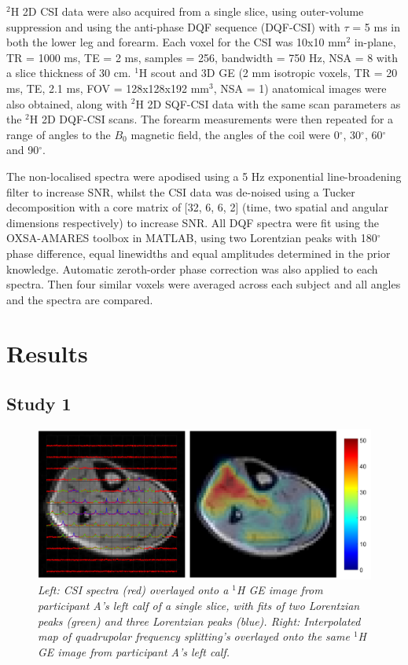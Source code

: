 $^2$H 2D \ac{CSI} data were also acquired from a single slice, using outer-volume suppression and using the anti-phase \ac{DQF} sequence (\ac{DQF}-\ac{CSI}) with $\tau$ = 5 ms in both the lower leg and forearm. Each voxel for the \ac{CSI} was 10x10 mm$^2$ in-plane, \ac{TR} = 1000 ms, \ac{TE} = 2 ms, samples = 256, bandwidth = 750 Hz, NSA = 8 with a slice thickness of 30 cm. $^1$H scout and 3D \ac{GE} (2 mm isotropic voxels, \ac{TR} = 20 ms, \ac{TE}, 2.1 ms, \ac{FOV} = 128x128x192 mm$^3$, NSA = 1) anatomical images were also obtained, along with $^2$H 2D \ac{SQF}-\ac{CSI} data with the same scan parameters as the $^2$H 2D \ac{DQF}-\ac{CSI} scans. The forearm measurements were then repeated for a range of angles to the $B_0$ magnetic field, the angles of the coil were 0$^\circ$, 30$^\circ$, 60$^\circ$ and 90$^\circ$. 

The non-localised spectra were apodised using a 5 Hz exponential line-broadening filter to increase \ac{SNR}, whilst the \ac{CSI} data was de-noised using a Tucker decomposition \cite{Bader2007EfficientTensors} with a core matrix of [32, 6, 6, 2] (time, two spatial and angular dimensions respectively) to increase \ac{SNR}. All \ac{DQF} spectra were fit using the OXSA-AMARES \cite{Purvis2017OXSA:MATLAB} toolbox in MATLAB, using two Lorentzian peaks with 180$^\circ$ phase difference, equal linewidths and equal amplitudes determined in the prior knowledge. Automatic zeroth-order phase correction was also applied to each spectra. Then four similar voxels were averaged across each subject and all angles and the spectra are compared.

\section{Results}

\subsection{Study 1}

\begin{figure}
    \centering
    \includegraphics[width=1\textwidth]{Figures/Quad/Calf_A.png}
    \caption{\textit{Left: \ac{CSI} spectra (red) overlayed onto a $^1$H \ac{GE} image from participant A's left calf of a single slice, with fits of two Lorentzian peaks (green) and three Lorentzian peaks (blue). Right: Interpolated map of quadrupolar frequency splitting's overlayed onto the same $^1$H \ac{GE} image from participant A's left calf.}}
    \label{fig:Quad:Calf_A}
\end{figure}

